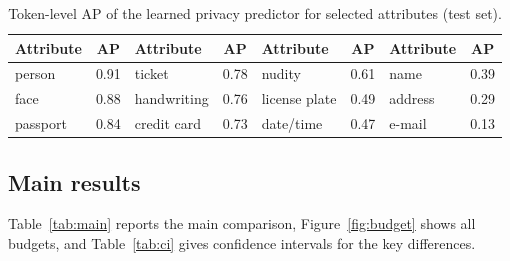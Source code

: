 \documentclass{article}
\begin{document}
\begin{table}[h]
\centering\small
\caption{Token-level AP of the learned privacy predictor for selected attributes (test set).}
\label{tab:head}
\begin{tabular}{@{}lc lc lc lc@{}}
\toprule
Attribute & AP & Attribute & AP & Attribute & AP & Attribute & AP \\
\midrule
person & 0.91 & ticket & 0.78 & nudity & 0.61 & name & 0.39 \\
face & 0.88 & handwriting & 0.76 & license plate & 0.49 & address & 0.29 \\
passport & 0.84 & credit card & 0.73 & date/time & 0.47 & e-mail & 0.13 \\
\bottomrule
\end{tabular}
\end{table}

\subsection{Main results}
Table~\ref{tab:main} reports the main comparison, Figure~\ref{fig:budget} shows all budgets, and Table~\ref{tab:ci} gives confidence intervals for the key differences.
\end{document}
